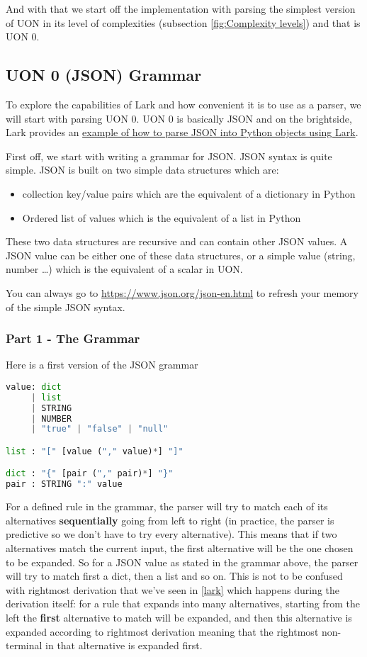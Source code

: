 \documentclass[12pt]{article}
\begin{document}
And with that we start off the implementation with parsing the simplest version of UON in its level of complexities (subsection \ref{fig:Complexity levels}) and that is UON 0.

\subsection{UON 0 (JSON) Grammar}
To explore the capabilities of Lark and how convenient it is to use as a parser, we will start with parsing UON 0. UON 0 is basically JSON and on the brightside, Lark provides an \href{https://github.com/lark-parser/lark/blob/master/docs/json_tutorial.md}{example of how to parse JSON into Python objects using Lark}. 

First off, we start with writing a grammar for JSON. JSON syntax is quite simple. JSON is built on two simple data structures which are:
\begin{itemize}
    \item collection key/value pairs which are the equivalent of a dictionary in Python
    \item Ordered list of values which is the equivalent of a list in Python
\end{itemize}
These two data structures are recursive and can contain other JSON values.
A JSON value can be either one of these data structures, or a simple value (string, number …) which is the equivalent of a scalar in UON.

You can always go to \url{https://www.json.org/json-en.html} to refresh your memory of the simple JSON syntax.

\subsubsection{Part 1 - The Grammar}
Here is a first version of the JSON grammar

\begin{lstlisting}[language=Python]
value: dict
     | list
     | STRING
     | NUMBER
     | "true" | "false" | "null"

list : "[" [value ("," value)*] "]"

dict : "{" [pair ("," pair)*] "}"
pair : STRING ":" value
\end{lstlisting}

For a defined rule in the grammar, the parser will try to match each of its alternatives \textbf{sequentially} going from left to right (in practice, the parser is predictive so we don't have to try every alternative). This means that if two alternatives match the current input, the first alternative will be the one chosen to be expanded. So for a JSON value as stated in the grammar above, the parser will try to match first a dict, then a list and so on. This is not to be confused with rightmost derivation that we've seen in \ref{lark} which happens during the derivation itself: for a rule that expands into many alternatives, starting from the left the \textbf{first} alternative to match will be expanded, and then this alternative is expanded according to rightmost derivation meaning that the rightmost non-terminal in that alternative is expanded first. 
\end{document}
